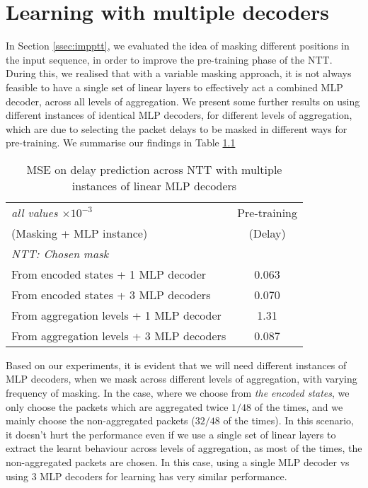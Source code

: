 \chapter{Learning with multiple decoders}
\label{app:b}

In Section \ref{ssec:impptt}, we evaluated the idea of masking different positions in the input sequence, in order to improve the pre-training phase of the NTT.  During this, we realised that with a variable masking approach, it is not always feasible to have a single set of linear layers to effectively act a combined MLP decoder, across all levels of aggregation. We present some further results on using different instances of identical MLP decoders, for different levels of aggregation, which are due to selecting the packet delays to be masked in different ways for pre-training. We summarise our findings in Table \ref{app:table2}

\begin{table}[htbp]
\centering
\begin{tabular}{ l   c  }
\toprule
\emph{all values $\times10^{-3}$} & Pre-training \\
(Masking + MLP instance) & (Delay)  \\
                                                       
\midrule
\em{NTT: Chosen mask}                                              & 		 	 \\
\smallindent From encoded states + 1 MLP decoder                                         &      0.063         \\
\smallindent From encoded states + 3 MLP decoders                                         &     0.070          \\
\smallindent From aggregation levels + 1 MLP decoder  					&     1.31          \\
\smallindent  From aggregation levels + 3 MLP decoders  					&     0.087          \\
 
    
\bottomrule

\end{tabular}
\caption{MSE on delay prediction across NTT with multiple instances of linear MLP decoders}
\label{app:table2}
\end{table}

Based on our experiments, it is evident that we will need different instances of MLP decoders, when we mask across different levels of aggregation, with varying frequency of masking. In the case, where we choose from \emph{the encoded states}, we only choose the packets which are aggregated twice $1/48$ of the times, and we mainly choose the non-aggregated packets ($32/48$ of the times). In this scenario, it doesn't hurt the performance even if we use a single set of linear layers to extract the learnt behaviour across levels of aggregation, as most of the times, the non-aggregated packets are chosen. In this case, using a single MLP decoder vs using $3$ MLP decoders for learning has very similar performance.

